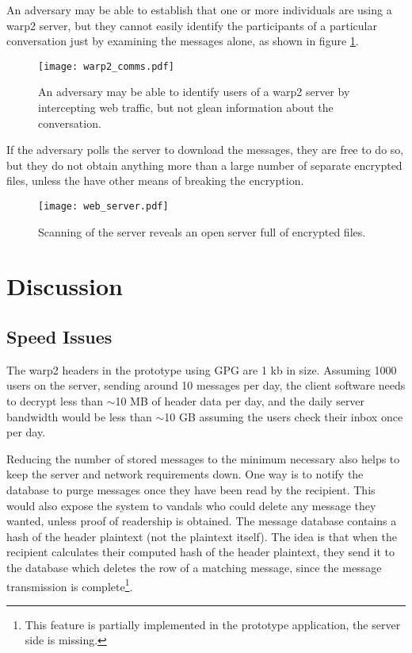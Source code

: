 \pdfoutput=1 \documentclass{article}
\begin{document}
An adversary may be able to establish that one or more individuals are using a warp2 server, but they cannot easily identify the participants of a particular conversation just by examining the messages alone, as shown in figure \ref{fig:comms}.
\begin{figure}
\centering
\texttt{[image: warp2\_comms.pdf]}
\caption{An adversary may be able to identify users of a warp2 server by intercepting web traffic, but not glean information about the conversation.}
\label{fig:comms}
\end{figure}

If the adversary polls the server to download the messages, they are free to do so, but they do not obtain anything more than a large number of separate encrypted files, unless the have other means of breaking the encryption.  
\begin{figure}
\centering
\texttt{[image: web\_server.pdf]}
\caption{Scanning of the server reveals an open server full of encrypted files.}
\label{fig:webserver}
\end{figure}






\section{Discussion}


\subsection{Speed Issues\label{sec:speed}}
The warp2 headers in the prototype using GPG are 1 kb in size.  Assuming 1000 users on the server, sending around 10 messages per day, the client software needs to decrypt less than $\sim$10 MB of header data per day, and the daily server bandwidth would be less than $\sim$10 GB assuming the users check their inbox once per day.

Reducing the number of stored messages to the minimum necessary also helps to keep the server and network requirements down.  One way is to notify the database to purge messages once they have been read by the recipient.  This would also expose the system to vandals who could delete any message they wanted, unless proof of readership is obtained.  The message database contains a hash of the header plaintext (not the plaintext itself).  The idea is that when the recipient calculates their computed hash of the header plaintext, they send it to the database which deletes the row of a matching message, since the message transmission is complete\footnote{This feature is partially implemented in the prototype application, the server side is missing.}.
\end{document}
